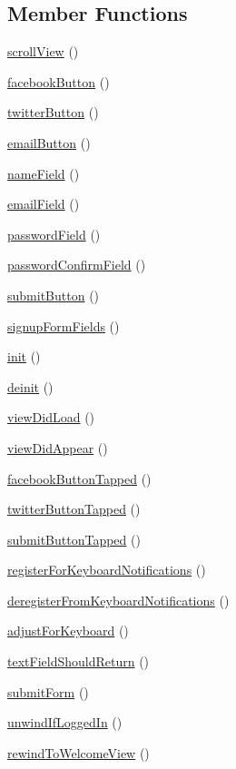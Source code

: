 \subsection*{Member Functions}
\begin{DoxyCompactItemize}
\item 
\hyperlink{class_SignupViewController.iOS.scrollView}{scrollView} ()
\item 
\hyperlink{class_SignupViewController.iOS.facebookButton}{facebookButton} ()
\item 
\hyperlink{class_SignupViewController.iOS.twitterButton}{twitterButton} ()
\item 
\hyperlink{class_SignupViewController.iOS.emailButton}{emailButton} ()
\item 
\hyperlink{class_SignupViewController.iOS.nameField}{nameField} ()
\item 
\hyperlink{class_SignupViewController.iOS.emailField}{emailField} ()
\item 
\hyperlink{class_SignupViewController.iOS.passwordField}{passwordField} ()
\item 
\hyperlink{class_SignupViewController.iOS.passwordConfirmField}{passwordConfirmField} ()
\item 
\hyperlink{class_SignupViewController.iOS.submitButton}{submitButton} ()
\item 
\hyperlink{class_SignupViewController.iOS.signupFormFields}{signupFormFields} ()
\item 
\hyperlink{class_SignupViewController.iOS.init}{init} ()
\item 
\hyperlink{class_SignupViewController.iOS.deinit}{deinit} ()
\item 
\hyperlink{class_SignupViewController.iOS.viewDidLoad}{viewDidLoad} ()
\item 
\hyperlink{class_SignupViewController.iOS.viewDidAppear}{viewDidAppear} ()
\item 
\hyperlink{class_SignupViewController.iOS.facebookButtonTapped}{facebookButtonTapped} ()
\item 
\hyperlink{class_SignupViewController.iOS.twitterButtonTapped}{twitterButtonTapped} ()
\item 
\hyperlink{class_SignupViewController.iOS.submitButtonTapped}{submitButtonTapped} ()
\item 
\hyperlink{class_SignupViewController.iOS.registerForKeyboardNotifications}{registerForKeyboardNotifications} ()
\item
\hyperlink{class_SignupViewController.iOS.deregisterFromKeyboardNotifications}{deregisterFromKeyboardNotifications} ()
\item
\hyperlink{class_SignupViewController.iOS.adjustForKeyboard}{adjustForKeyboard} ()
\item
\hyperlink{class_SignupViewController.iOS.textFieldShouldReturn}{textFieldShouldReturn} ()
\item
\hyperlink{class_SignupViewController.iOS.submitForm}{submitForm} ()
\item
\hyperlink{class_SignupViewController.iOS.unwindIfLoggedIn}{unwindIfLoggedIn} ()
\item
\hyperlink{class_SignupViewController.iOS.rewindToWelcomeView}{rewindToWelcomeView} ()


\end{DoxyCompactItemize}
